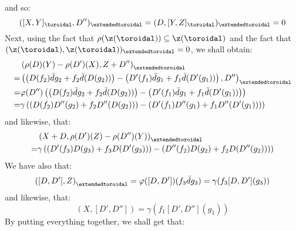 \begin{enumerate}
                    and so:
                        $$([X, Y]_{\toroidal}, D'')_{\extendedtoroidal} = (D, [Y, Z]_{\toroidal})_{\extendedtoroidal} = 0$$
                    Next, using the fact that $\rho(\z(\toroidal)) \subseteq \z(\toroidal)$ and the fact that $(\z(\toroidal), \z(\toroidal))_{\extendedtoroidal} = 0$, we shall obtain:
                        $$
                            \begin{aligned}
                                & \left(\rho(D)(Y) - \rho(D')(X), Z + D'' \right)_{\extendedtoroidal}
                                \\
                                = & \left( \left( D(f_2) \bar{d}g_2 + f_2 \bar{d}( D(g_2) ) \right) - \left( D'(f_1) \bar{d}g_1 + f_1 \bar{d}( D'(g_1) ) \right), D'' \right)_{\extendedtoroidal}
                                \\
                                = & \varphi(D'')\left( \left( D(f_2) \bar{d}g_2 + f_2 \bar{d}( D(g_2) ) \right) - \left( D'(f_1) \bar{d}g_1 + f_1 \bar{d}( D'(g_1) ) \right) \right)
                                \\
                                = & \gamma\left(
                                    \left( D(f_2) D''(g_2) + f_2 D''( D(g_2) ) \right) - \left( D'(f_1) D''(g_1) + f_1 D''( D'(g_1) ) \right)
                                \right)
                            \end{aligned}
                        $$
                    and likewise, that:
                        $$
                            \begin{aligned}
                                & \left( X + D, \rho(D')(Z) - \rho(D'')(Y) \right)_{\extendedtoroidal}
                                \\
                                = & \gamma\left(
                                \left( D'(f_3) D(g_3) + f_3 D( D'(g_3) ) \right) - \left( D''(f_2) D(g_2) + f_2 D( D''(g_2) ) \right)
                        \right)
                            \end{aligned}
                        $$
                    We have also that:
                        $$\left( [D, D'], Z \right)_{\extendedtoroidal} = \varphi([D, D'])( f_3 \bar{d} g_3 ) = \gamma(f_3 [D, D'](g_3))$$
                    and likewise, that:
                        $$\left(X, [D', D'']\right) = \gamma(f_1 [D', D''](g_1))$$
                    By putting everything together, we shall get that:
                        $$
                            \begin{aligned}

\end{aligned}$$
\end{enumerate}
